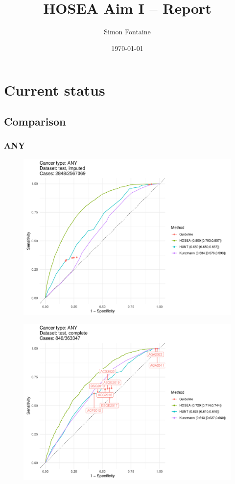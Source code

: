 \documentclass[12pt]{article}
\title{HOSEA Aim I -- Report}
\author{Simon Fontaine}
\date{\today}
\begin{document}
\maketitle




\section{Current status}

\subsection{Comparison}

\subsubsection{ANY}

\begin{figure}[ht]
\includegraphics[width=1.0\linewidth]{comparison/ANY_imputed.pdf}
\end{figure}

\begin{figure}[ht]
\includegraphics[width=1.0\linewidth]{comparison/ANY_complete.pdf}
\end{figure}
\end{document}
